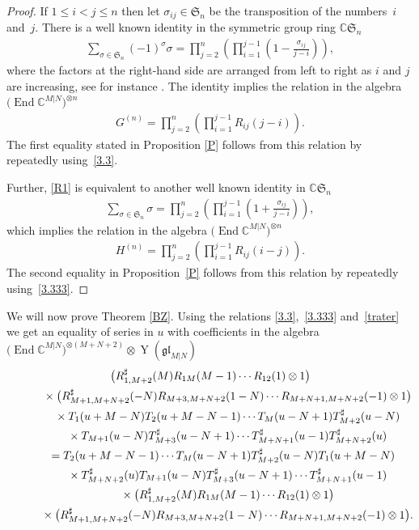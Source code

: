 \documentclass[10pt,a4paper]{amsart}
\numberwithin{equation}{section}
\def\CC{{\mathbb{C}}}
\def\CMN{\CC^{M|N}}
\def\End{\operatorname{End}}
\def\glMN{\mathfrak{gl}_{M|N}}
\def\le{\leqslant}
\def\ot{\otimes}
\def\RS{R^{\sharp}}
\def\si{\sigma}
\def\Sym{\mathfrak{S}}
\def\TS{T^{\sharp}}
\def\YMN{\operatorname{Y}(\glMN)}
\begin{document}
\begin{proof}
If $1\le i<j\le n$ then let $\si_{ij}\in\Sym_n$ be the transposition of
the numbers~$i$ and~$j $.
There is a well known identity in the symmetric group ring $\CC \Sym_n$
\begin{gather}\label{R1}
\sum_{\si\in\Sym_n}(-1)^\si \si =
\prod_{j=2}^n \left( \prod_{i=1}^{j-1} \left( 1-\frac{\si_{ij}}{j-i}
\right)\right),
\end{gather}
where the factors at the right-hand side are arranged from left to right
as $i$ and $j$ are increasing, see
for instance \cite[Section~2.3]{MNO}.
The identity implies the relation in the algebra $\big(\End\CMN\big)^{\ot n}${\samepage
\begin{gather}\label{RG}
G^{(n)} =\prod_{j=2}^n \left( \prod_{i=1}^{j-1} R_{ij}(j-i) \right) .
\end{gather}
The first equality stated in Proposition \ref{P} follows from this relation
by repeatedly using~\eqref{3.3}.}

Further, \eqref{R1} is equivalent to another well known
identity in $\CC \Sym_n$
\begin{gather*}
\sum_{\si\in\Sym_n}\si =\prod_{j=2}^n \left( \prod_{i=1}^{j-1} \left( 1+\frac{\si_{ij}}{j-i}\right)\right),
\end{gather*}
which implies the relation in the algebra $\big(\End\CMN\big)^{\ot n}$
\begin{gather}\label{RH}
H^{(n)} =
\prod_{j=2}^n \left(\prod_{i=1}^{j-1} R_{ij}(i-j) \right) .
\end{gather}
The second equality in Proposition~\ref{P} follows from this relation
by repeatedly using~\eqref{3.333}.
\end{proof}

We will now prove Theorem \ref{BZ}. Using the relations \eqref{3.3},~\eqref{3.333} and~\eqref{trater}
we get an equality of series in $u$ with coefficients
in the algebra $\big(\End\CMN\big)^{\ot (M+N+2)}\ot\YMN$
\begin{gather}
\big( \RS_{1,M+2} (M ) R_{1M} (M-1) \cdots R_{12} (1)\ot1 \big)\notag\\
\qquad\quad{} \times
\big( \RS_{M+1,M+N+2} (-N )
R_{M+3,M+N+2} (1-N) \cdots R_{M+N+1,M+N+2} (-1)\ot1 \big)\notag\\
\qquad\quad{}\times
T_1 (u+M-N) T_2 (u+M-N-1) \cdots T_{M} (u-N+1)
\TS_{M+2} (u-N)\notag\\
\qquad\quad {} \times T_{M+1} (u-N)
\TS_{M+3} (u-N+1) \cdots \TS_{M+N+1} (u-1) \TS_{M+N+2} (u)\notag\\
\qquad{}=T_2 (u+M-N-1) \cdots T_{M} (u-N+1)
\TS_{M+2} (u-N) T_1 (u+M-N)\notag\\
\qquad\quad{} \times
\TS_{M+N+2} (u) T_{M+1} (u-N)
\TS_{M+3} (u-N+1) \cdots \TS_{M+N+1} (u-1)\notag\\
\qquad\quad{} \times
\big( \RS_{1,M+2} (M )
R_{1M} (M-1) \cdots R_{12} (1)\ot1 \big)\notag\\
\qquad\quad{} \times
\big( \RS_{M+1,M+N+2} (-N )
R_{M+3,M+N+2} (1-N) \cdots R_{M+N+1,M+N+2} (-1)\ot1 \big) .\label{E1}
\end{gather}
\end{document}
